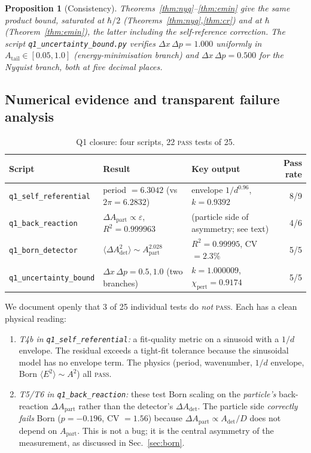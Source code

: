 \documentclass[11pt,a4paper]{article}
\newcommand{\Atail}{A_{\mathrm{tail}}}
\newcommand{\AdetSym}{A_{\mathrm{det}}}
\newcommand{\ApartSym}{A_{\mathrm{part}}}
\newcommand{\chiTGP}{\chi}
\newcommand{\eps}{\varepsilon}
\newtheorem{proposition}[theorem]{Proposition}
\begin{document}
\begin{proposition}[Consistency]\label{prop:3derivations}
Theorems~\ref{thm:nyq}--\ref{thm:emin} give the same product bound,
saturated at $\hbar/2$ (Theorems~\ref{thm:nyq},\ref{thm:cr}) and at
$\hbar$ (Theorem~\ref{thm:emin}), the latter including the
self-reference correction. The script
\verb|q1_uncertainty_bound.py| verifies $\Delta x\,\Delta p=1.000$
uniformly in $\Atail\in[0.05,1.0]$ (energy-minimisation branch) and
$\Delta x\,\Delta p=0.500$ for the Nyquist branch, both at five
decimal places.
\end{proposition}

\subsection{Numerical evidence and transparent failure analysis}

\begin{table}[h]
\centering
\small
\caption{Q1 closure: four scripts, 22 \textsc{pass} tests of 25.}
\label{tab:q1-summary}
\begin{tabular}{lllr}
\toprule
Script & Result & Key output & Pass rate \\
\midrule
\verb|q1_self_referential|    & period $=6.3042$ (vs $2\pi=6.2832$) &
  envelope $1/d^{0.96}$, $k=0.9392$ & 8/9 \\
\verb|q1_back_reaction|       & $\Delta A_{\mathrm{part}}\propto\eps$, $R^{2}=0.999963$ &
  (particle side of asymmetry; see text) & 4/6 \\
\verb|q1_born_detector|       & $\langle\Delta\AdetSym^{2}\rangle\sim\ApartSym^{2.028}$ &
  $R^{2}=0.99995$, CV $=2.3\%$ & 5/5 \\
\verb|q1_uncertainty_bound|   & $\Delta x\,\Delta p=0.5, 1.0$ (two branches) &
  $k=1.000009$, $\chiTGP_{\mathrm{pert}}=0.9174$ & 5/5 \\
\bottomrule
\end{tabular}
\end{table}

We document openly that 3 of 25 individual tests do \emph{not}
\textsc{pass}. Each has a clean physical reading:

\begin{enumerate}[leftmargin=1.4em]
\item \emph{T4b in \texttt{q1\_self\_referential}:} a fit-quality metric
on a sinusoid with a $1/d$ envelope. The residual exceeds a
tight-fit tolerance because the sinusoidal model has no envelope
term. The physics (period, wavenumber, $1/d$ envelope, Born $\langle
E^{2}\rangle\sim A^{2}$) all \textsc{pass}.
\item \emph{T5/T6 in \texttt{q1\_back\_reaction}:} these test Born
scaling on the \emph{particle's} back-reaction $\Delta\ApartSym$
rather than the detector's $\Delta\AdetSym$. The particle side
\emph{correctly fails} Born ($p=-0.196$, CV $=1.56$) because
$\Delta\ApartSym\propto\AdetSym/D$ does not depend on $\ApartSym$.
This is not a bug; it is the central asymmetry of the measurement,
as discussed in Sec.~\ref{sec:born}.
\end{enumerate}
\end{document}
